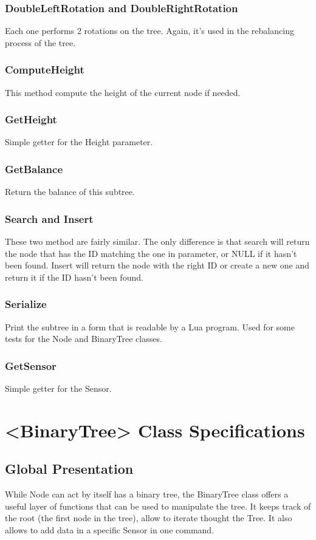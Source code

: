 \documentclass[10pt]{article}
\begin{document}
\subsubsection*{DoubleLeftRotation and DoubleRightRotation}
Each one performs 2 rotations on the tree. Again, it's used in the rebalancing process of the tree.

\subsubsection*{ComputeHeight}
This method compute the height of the current node if needed.

\subsubsection*{GetHeight}
Simple getter for the Height parameter.

\subsubsection*{GetBalance}
Return the balance of this subtree.

\subsubsection*{Search and Insert}
These two method are fairly similar. The only difference is that search will return the node that has the ID matching the one in parameter, or NULL if it hasn't been found. Insert will return the node with the right ID or create a new one and return it if the ID hasn't been found.

\subsubsection*{Serialize}
Print the subtree in a form that is readable by a Lua program. Used for some tests for the Node and BinaryTree classes.

\subsubsection*{GetSensor}
Simple getter for the Sensor.

\section{<BinaryTree> Class Specifications}
\subsection{Global Presentation}
While Node can act by itself has a binary tree, the BinaryTree class offers a useful layer of functions that can be used to manipulate the tree. It keeps track of the root (the first node in the tree), allow to iterate thought the Tree. It also allows to add data in a specific Sensor in one command.
\end{document}
